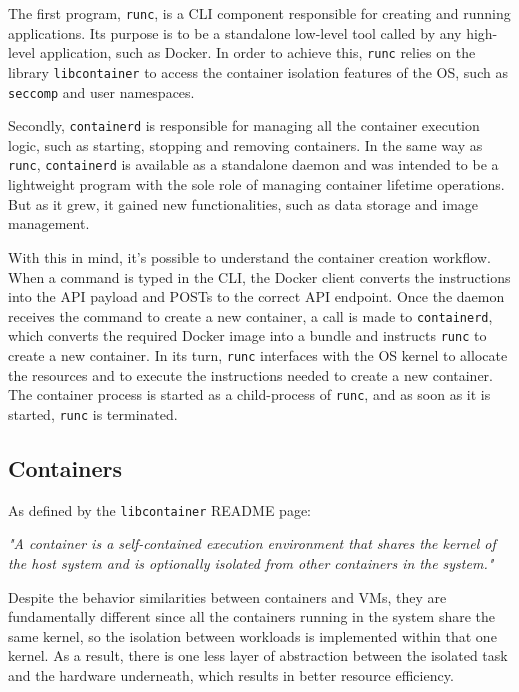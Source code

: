 The first program, \texttt{runc}, is a \acs{CLI} component responsible for creating and running applications. Its purpose is to be a standalone low-level tool called by any high-level application, such as Docker. In order to achieve this, \texttt{runc} relies on the library \texttt{libcontainer} to access the container isolation features of the \acs{OS}, such as \texttt{seccomp} and user namespaces\cite{runc-estes}.

Secondly, \texttt{containerd} is responsible for managing all the container execution logic, such as starting, stopping and removing containers. In the same way as \texttt{runc}, \texttt{containerd} is available as a standalone daemon and was intended to be a lightweight program with the sole role of managing container lifetime operations. But as it grew, it gained new functionalities, such as data storage and image management\cite{docker-containerd}.

With this in mind, it's possible to understand the container creation workflow. When a command is typed in the \acs{CLI}, the Docker client converts the instructions into the \acs{API} payload and POSTs to the correct API endpoint. Once the daemon receives the command to create a new container, a call is made to \texttt{containerd}, which converts the required Docker image into a bundle and instructs \texttt{runc} to create a new container. In its turn, \texttt{runc} interfaces with the \acs{OS} kernel to allocate the resources and to execute the instructions needed to create a new container. The container process is started as a child-process of \texttt{runc}, and as soon as it is started, \texttt{runc} is terminated.



\subsection{Containers}
\label{sec::arch:containers}
As defined by the \texttt{libcontainer} README page\cite{docker-libcontainer}:

\begin{displayquote}
    \textit{"A container is a self-contained execution environment that shares the kernel of the host system and is optionally isolated from other containers in the system."}
\end{displayquote}

Despite the behavior similarities between containers and \acsp{VM}, they are fundamentally different since all the containers running in the system share the same kernel, so the isolation between workloads is implemented within that one kernel. As a result, there is one less layer of abstraction between the isolated task and the hardware underneath, which results in better resource efficiency.

